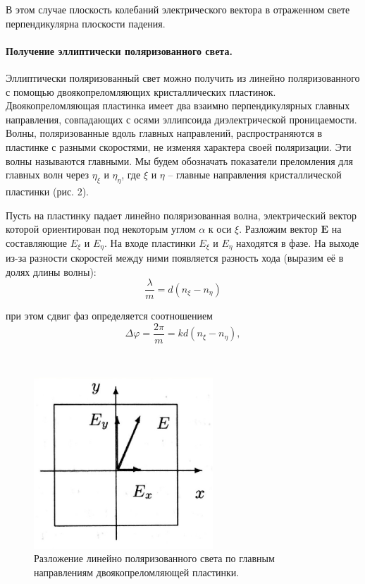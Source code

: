 \documentclass[a4paper, 12pt, twoside]{article}
\begin{document}
	В этом случае плоскость колебаний электрического вектора в отраженном свете перпендикулярна плоскости падения.
	
	\paragraph{Получение эллиптически поляризованного света.} 
	Эллиптически поляризованный свет можно получить из линейно поляризованного с
	помощью двоякопреломляющих кристаллических пластинок. Двоякопреломляющая пластинка имеет два взаимно перпендикулярных главных направления, совпадающих с осями эллипсоида диэлектрической проницаемости. Волны, поляризованные вдоль главных направлений, распространяются в пластинке с разными скоростями, не изменяя
	характера своей поляризации. Эти волны называются главными.	Мы будем обозначать показатели преломления для главных волн через $\eta_\xi$ и $\eta_\eta$, где $\xi$ и $\eta$ -- главные направления кристаллической пластинки	(рис. 2).\\

	\begin{minipage}{0.6\linewidth}
		Пусть на пластинку падает линейно поляризованная волна, электрический вектор которой ориентирован под некоторым углом $\alpha$ к оси $\xi$. Разложим вектор $\mathbf{E}$ на составляющие	$E_\xi$ и $E_\eta$. На входе пластинки $E_\xi$ и $E_\eta$ находятся в фазе. На выходе из-за разности скоростей между ними появляется разность
		хода (выразим её в долях длины волны):
		\begin{equation}
		\dfrac{\lambda}{m} = d(n_\xi - n_\eta)
		\end{equation}
		
		при этом сдвиг фаз определяется соотношением 
		\begin{equation}
		\Delta \varphi = \dfrac{2 \pi }{m} = kd(n_\xi - n_\eta),
		\end{equation}
		
	\end{minipage}
	~
	\begin{minipage}{0.39\linewidth}
			\begin{figure}[H]
			\centering
			\includegraphics[width =  0.6\textwidth]{ris2}
			\caption{Разложение линейно поляризованного света по главным направлениям двоякопреломляющей пластинки.}
			\label{ris2}
		\end{figure}
	\end{minipage}\\
\end{document}

